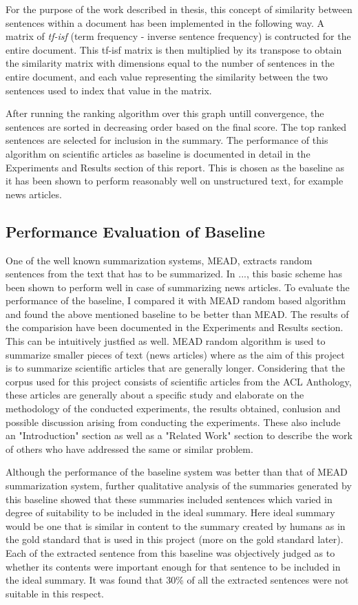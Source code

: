 For the purpose of the work described in thesis, this concept of similarity between sentences within a document has been implemented in the following way.
A matrix of \emph{tf-isf} (term frequency - inverse sentence frequency) is contructed for the entire document.
This tf-isf matrix is then multiplied by its transpose to obtain the similarity matrix with dimensions equal to the number of sentences in the entire document, and each value representing the similarity between the two sentences used to index that value in the matrix.

After running the ranking algorithm over this graph untill convergence, the sentences are sorted in decreasing order based on the final score.
The top ranked sentences are selected for inclusion in the summary.
The performance of this algorithm on scientific articles as baseline is documented in detail in the Experiments and Results section of this report.
This is chosen as the baseline as it has been shown to perform reasonably well on unstructured text, for example news articles.

\subsection*{Performance Evaluation of Baseline}
One of the well known summarization systems, MEAD, extracts random sentences from the text that has to be summarized.
In ..., this basic scheme has been shown to perform well in case of summarizing news articles.
To evaluate the performance of the baseline, I compared it with MEAD random based algorithm and found the above mentioned baseline to be better than MEAD.
The results of the comparision have been documented in the Experiments and Results section.
This can be intuitively justfied as well.
MEAD random algorithm is used to summarize smaller pieces of text (news articles) where as the aim of this project is to summarize scientific articles that are generally longer.
Considering that the corpus used for this project consists of scientific articles from the ACL Anthology, these articles are generally about a specific study and elaborate on the methodology of the conducted experiments, the results obtained, conlusion and possible discussion arising from conducting the experiments.
These also include an "Introduction" section as well as a "Related Work" section to describe the work of others who have addressed the same or similar problem.

Although the performance of the baseline system was better than that of MEAD summarization system, further qualitative analysis of the summaries generated by this baseline showed that these summaries included sentences which varied in degree of suitability to be included in the ideal summary.
Here ideal summary would be one that is similar in content to the summary created by humans as in the gold standard that is used in this project (more on the gold standard later).
Each of the extracted sentence from this baseline was objectively judged as to whether its contents were important enough for that sentence to be included in the ideal summary.
It was found that 30\% of all the extracted sentences were not suitable in this respect.

